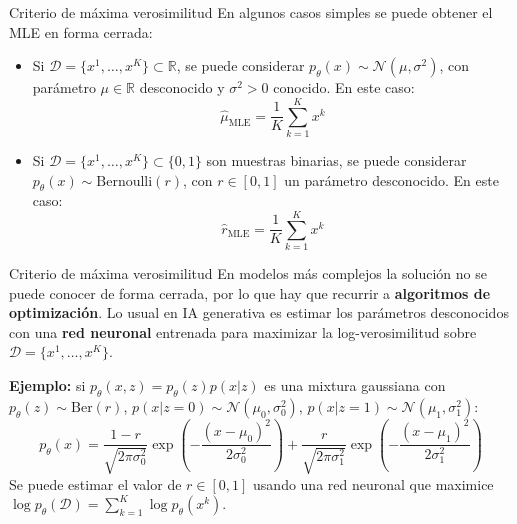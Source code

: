 \documentclass{beamer}
\newcommand{\R}{\mathbb{R}}
\begin{document}
\begin{frame}{Criterio de máxima verosimilitud}
    En algunos casos simples se puede obtener el MLE en forma cerrada:
    \begin{itemize}
        \item Si $\mathcal{D}=\{x^1,\ldots,x^K\}\subset\R$, se puede considerar $p_\theta(x)\sim\mathcal{N}(\mu,\sigma^2)$, con parámetro $\mu\in\R$ desconocido y $\sigma^2>0$ conocido. En este caso:
        \begin{equation*}
            \hat\mu_\text{MLE}=\frac{1}{K}\sum_{k=1}^K x^k
        \end{equation*}
        \item Si $\mathcal{D}=\{x^1,\ldots,x^K\}\subset\{0,1\}$ son muestras binarias, se puede considerar $p_\theta(x)\sim\text{Bernoulli}(r)$, con $r\in[0,1]$ un parámetro desconocido. En este caso:
        \begin{equation*}
            \hat r_\text{MLE}=\frac{1}{K}\sum_{k=1}^K x^k
        \end{equation*}
    \end{itemize}
\end{frame}

\begin{frame}{Criterio de máxima verosimilitud}
    En modelos más complejos la solución no se puede conocer de forma cerrada, por lo que hay que recurrir a \textbf{algoritmos de optimización}. Lo usual en IA generativa es estimar los parámetros desconocidos con una \textbf{red neuronal} entrenada para maximizar la log-verosimilitud sobre $\mathcal{D}=\{x^1,\ldots,x^K\}$.

    \textbf{Ejemplo:} si $p_\theta(x,z)=p_\theta(z)p(x|z)$ es una mixtura gaussiana con $p_\theta(z)\sim\text{Ber}(r)$, $p(x|z=0)\sim\mathcal{N}(\mu_0,\sigma_0^2)$, $p(x|z=1)\sim\mathcal{N}(\mu_1,\sigma_1^2)$:
    \begin{equation*}
        p_\theta(x)=\frac{1-r}{\sqrt{2\pi\sigma_0^2}}\exp\left(-\frac{(x-\mu_0)^2}{2\sigma_0^2}\right) + \frac{r}{\sqrt{2\pi\sigma_1^2}}\exp\left(-\frac{(x-\mu_1)^2}{2\sigma_1^2}\right)
    \end{equation*}
    Se puede estimar el valor de $r\in[0,1]$ usando una red neuronal que maximice $ \log p_\theta(\mathcal{D})=\sum_{k=1}^K \log p_\theta(x^k)$.
\end{frame}
\end{document}
